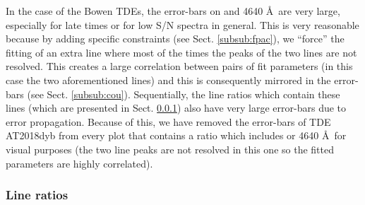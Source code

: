 \documentclass[structabstract]{aa}
\begin{document}
In the case of the Bowen TDEs, the error-bars on  and  4640 \AA\, are very large, especially for late times or for low S/N spectra in general. This is very reasonable because by adding specific constraints (see Sect. \ref{subsub:fpac}), we ``force'' the fitting of an extra line where most of the times the peaks of the two lines are not resolved. This creates a large correlation between pairs of fit parameters (in this case the two aforementioned lines) and this is consequently mirrored in the error-bars (see Sect. \ref{subsub:cou}). Sequentially, the line ratios which contain these lines (which are presented in Sect. \ref{subsub:lr}) also have very large error-bars due to error propagation. Because of this, we have removed the error-bars of TDE AT2018dyb from every plot that contains a ratio which includes  or  4640 \AA\, for visual purposes (the two line peaks are not resolved in this one so the fitted parameters are highly correlated).


\subsubsection{Line ratios} \label{subsub:lr}
\end{document}
